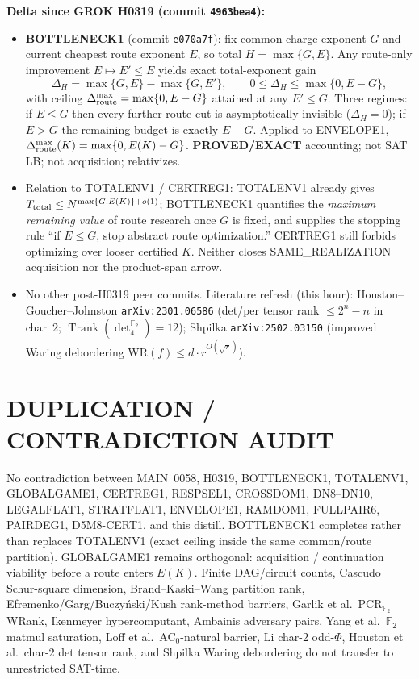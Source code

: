 \documentclass[11pt]{article}
\begin{document}
\textbf{Delta since GROK H0319 (commit \texttt{4963bea4}):}
\begin{itemize}
\item \textbf{BOTTLENECK1} (commit \texttt{e070a7f}): fix common-charge exponent
$G$ and current cheapest route exponent $E$, so total $H=\max\{G,E\}$. Any
route-only improvement $E\mapsto E'\le E$ yields exact total-exponent gain
\[
\Delta_H=\max\{G,E\}-\max\{G,E'\},\qquad
0\le\Delta_H\le\max\{0,E-G\},
\]
with ceiling $\Delta_{\rm route}^{\max}=\max\{0,E-G\}$ attained at any
$E'\le G$. Three regimes: if $E\le G$ then every further route cut is
asymptotically invisible ($\Delta_H=0$); if $E>G$ the remaining budget is
exactly $E-G$. Applied to ENVELOPE1,
$\Delta_{\rm route}^{\max}(K)=\max\{0,E(K)-G\}$. \textbf{PROVED/EXACT}
accounting; not SAT LB; not acquisition; relativizes.
\item Relation to TOTALENV1 / CERTREG1: TOTALENV1 already gives
$T_{\rm total}\le N^{\max\{G,E(K)\}+o(1)}$; BOTTLENECK1 quantifies the
\emph{maximum remaining value} of route research once $G$ is fixed, and
supplies the stopping rule ``if $E\le G$, stop abstract route optimization.''
CERTREG1 still forbids optimizing over looser certified $K$. Neither closes
SAME\_REALIZATION acquisition nor the product-span arrow.
\item No other post-H0319 peer commits. Literature refresh (this hour):
Houston--Goucher--Johnston \texttt{arXiv:2301.06586} (det/per tensor rank
$\le 2^n-n$ in char~$2$; $\operatorname{Trank}(\det_4^{\mathbb F_2})=12$);
Shpilka \texttt{arXiv:2502.03150} (improved Waring debordering
$\mathrm{WR}(f)\le d\cdot r^{O(\sqrt r)}$).
\end{itemize}

\section*{DUPLICATION / CONTRADICTION AUDIT}
No contradiction between MAIN~0058, H0319, BOTTLENECK1, TOTALENV1, GLOBALGAME1,
CERTREG1, RESPSEL1, CROSSDOM1, DN8--DN10, LEGALFLAT1, STRATFLAT1, ENVELOPE1,
RAMDOM1, FULLPAIR6, PAIRDEG1, D5M8-CERT1, and this distill. BOTTLENECK1
completes rather than replaces TOTALENV1 (exact ceiling inside the same
common/route partition). GLOBALGAME1 remains orthogonal: acquisition /
continuation viability before a route enters $E(K)$. Finite DAG/circuit
counts, Cascudo Schur-square dimension, Brand--Kaski--Wang partition rank,
Efremenko/Garg/Buczy\'nski/Kush rank-method barriers, Garlik et al.\ PCR$_{\mathbb F_2}$
WRank, Ikenmeyer hypercomputant, Ambainis adversary pairs, Yang et al.\ $\mathbb F_2$
matmul saturation, Loff et al.\ AC$_0$-natural barrier, Li char-$2$ odd-$\Phi$,
Houston et al.\ char-$2$ det tensor rank, and Shpilka Waring debordering do not
transfer to unrestricted SAT-time.
\end{document}
